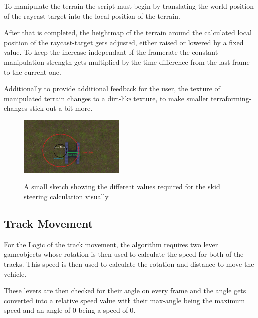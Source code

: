 \documentclass[journal]{vgtc}                     %
\begin{document}
To manipulate the terrain the script must begin by translating the world position of the raycast-target into the local position of the terrain. 

After that is completed, the heightmap of the terrain around the calculated local position of the raycast-target gets adjusted, either raised or lowered by a fixed value. To keep the increase independant of the framerate the constant manipulation-strength gets multiplied by the time difference from the last frame to the current one.

Additionally to provide additional feedback for the user, the texture of manipulated terrain changes to a dirt-like texture, to make smaller terraforming-changes stick out a bit more.

\begin{figure}[h]%
  \centering %
  \includegraphics[width=0.45\textwidth, alt={A Top-Down View of the track-base of the excavator with a few circles and radius showing the different values required for calculating the skid steering rotation}]{TrackBase}
  \caption{%
  	A small sketch showing the different values required for the skid steering calculation visually%
  }
  \label{fig:skid_steering_sketch}
\end{figure}
\subsection{Track Movement}

For the Logic of the track movement, the algorithm requires two lever gameobjects whose rotation is then used to calculate the speed for both of the tracks. This speed is then used to calculate the rotation and distance to move the vehicle.

These levers are then checked for their angle on every frame and the angle gets converted into a relative speed value with their max-angle being the maximum speed and an angle of 0 being a speed of 0.
\end{document}
